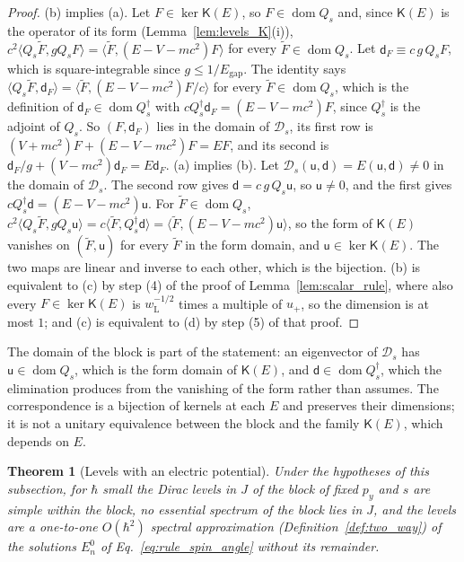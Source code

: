 \documentclass[aps,prd,onecolumn,tightenlines,nofootinbib,notitlepage,11pt,floatfix]{revtex4-2}
\theoremstyle{indentedtheorem}
\newtheorem{theorem}{Theorem}
\begin{document}
\begin{proof}
(b) implies (a). Let $F\in\ker\mathsf{K}(E)$, so $F\in\operatorname{dom}Q_s$ and, since $\mathsf{K}(E)$ is the operator of its form (Lemma~\ref{lem:levels_K}(i)), $c^2\langle Q_s\tilde{F},gQ_sF\rangle=\langle\tilde{F},(E-V-mc^2)F\rangle$ for every $\tilde{F}\in\operatorname{dom}Q_s$. Let $\mathsf{d}_F\equiv c\,g\,Q_sF$, which is square-integrable since $g\leq1/E_\text{gap}$. The identity says $\langle Q_s\tilde{F},\mathsf{d}_F\rangle=\langle\tilde{F},(E-V-mc^2)F/c\rangle$ for every $\tilde{F}\in\operatorname{dom}Q_s$, which is the definition of $\mathsf{d}_F\in\operatorname{dom}Q_s^\dagger$ with $cQ_s^\dagger\mathsf{d}_F=(E-V-mc^2)F$, since $Q_s^\dagger$ is the adjoint of $Q_s$. So $(F,\mathsf{d}_F)$ lies in the domain of $\mathcal{D}_s$, its first row is $(V+mc^2)F+(E-V-mc^2)F=EF$, and its second is $\mathsf{d}_F/g+(V-mc^2)\mathsf{d}_F=E\mathsf{d}_F$. (a) implies (b). Let $\mathcal{D}_s(\mathsf{u},\mathsf{d})=E(\mathsf{u},\mathsf{d})\neq0$ in the domain of $\mathcal{D}_s$. The second row gives $\mathsf{d}=c\,g\,Q_s\mathsf{u}$, so $\mathsf{u}\neq0$, and the first gives $cQ_s^\dagger\mathsf{d}=(E-V-mc^2)\mathsf{u}$. For $\tilde{F}\in\operatorname{dom}Q_s$, $c^2\langle Q_s\tilde{F},gQ_s\mathsf{u}\rangle=c\langle\tilde{F},Q_s^\dagger\mathsf{d}\rangle=\langle\tilde{F},(E-V-mc^2)\mathsf{u}\rangle$, so the form of $\mathsf{K}(E)$ vanishes on $(\tilde{F},\mathsf{u})$ for every $\tilde{F}$ in the form domain, and $\mathsf{u}\in\ker\mathsf{K}(E)$. The two maps are linear and inverse to each other, which is the bijection. (b) is equivalent to (c) by step (4) of the proof of Lemma~\ref{lem:scalar_rule}, where also every $F\in\ker\mathsf{K}(E)$ is $w_\text{L}^{-1/2}$ times a multiple of $u_+$, so the dimension is at most $1$; and (c) is equivalent to (d) by step (5) of that proof.
\end{proof}

\noindent The domain of the block is part of the statement: an eigenvector of $\mathcal{D}_s$ has $\mathsf{u}\in\operatorname{dom}Q_s$, which is the form domain of $\mathsf{K}(E)$, and $\mathsf{d}\in\operatorname{dom}Q_s^\dagger$, which the elimination produces from the vanishing of the form rather than assumes. The correspondence is a bijection of kernels at each $E$ and preserves their dimensions; it is not a unitary equivalence between the block and the family $\mathsf{K}(E)$, which depends on $E$.

\begin{theorem}[Levels with an electric potential]
\label{thm:levels_V}
Under the hypotheses of this subsection, for $\hbar$ small the Dirac levels in $J$ of the block of fixed $p_y$ and $s$ are simple within the block, no essential spectrum of the block lies in $J$, and the levels are a one-to-one $O(\hbar^2)$ spectral approximation (Definition~\ref{def:two_way}) of the solutions $E_n^0$ of Eq.~\eqref{eq:rule_spin_angle} without its remainder.
\end{theorem}
\end{document}
